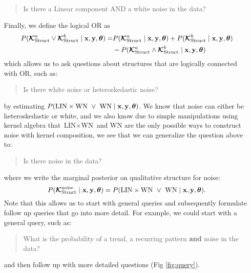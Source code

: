 \begin{quotation}
Is there a Linear component AND a white noise in the data? 
\end{quotation}
Finally, we define the logical OR as
\begin{align*}
P(\bm{\mathcal{K}}_\text{Struct}^a \lor \bm{\mathcal{K}}_\text{Struct}^b \mid \mathbf{x}, \mathbf{y}, \bm{\theta})
=& P(\bm{\mathcal{K}}_\text{Struct}^a \mid \mathbf{x}, \mathbf{y}, \bm{\theta}) + P(\bm{\mathcal{K}}_\text{Struct}^b \mid \mathbf{x}, \mathbf{y}, \bm{\theta})\\
 &- P(\bm{\mathcal{K}}_\text{Struct}^a \land \bm{\mathcal{K}}_\text{Struct}^b \mid \mathbf{x}, \mathbf{y}, \bm{\theta})
\end{align*}
which allows us to ask questions about structures that are logically connected with OR, such as:
\begin{quotation}
Is there white noise or heteroskedastic noise?
\end{quotation}
by estimating $P(\text{LIN} \times \text{WN}\;\;{\large\lor}\;\; \text{WN} \mid
\mathbf{x}, \mathbf{y}, \bm{\theta})$.
We know that noise can either be heteroskedastic or white,
and we also know due to simple manipulations using kernel algebra
that  $\text{LIN} \times \text{WN}$ and $\text{WN}$ are the only possible ways to construct noise with kernel composition, we see that we can generalize the 
question above to:
\begin{quotation}
Is there noise in the data? 
\end{quotation}
where we write the marginal posterior on qualitative structure for noise:
\begin{equation}
P(\bm{\mathcal{K}}_\text{Struct}^{\text{noise}} \mid \mathbf{x}, \mathbf{y}, \bm{\theta}) = P(\text{LIN} \times
\text{WN}\;\;{\large\lor}\;\; \text{WN} \mid \mathbf{x}, \mathbf{y}, \bm{\theta}).
\end{equation}
Note that this allows us to start with general queries and 
subsequently formulate follow up queries that go into more detail.
For example, we could start with a general query, such as:
\begin{quotation}
What is the probability of a trend, a recurring pattern {\bf and} noise in the data?
\end{quotation}
and then follow up with more detailed questions (Fig \ref{fig:query}).
